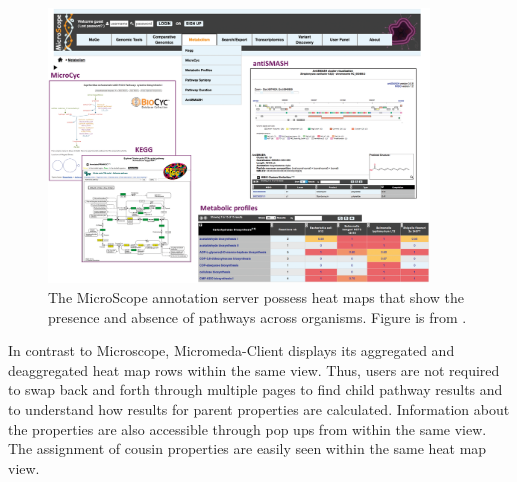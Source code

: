 \begin{figure}[!ht]
  \centering
	\includegraphics[width=0.9\textwidth]{media/microscope.png}
	 \caption{The MicroScope annotation server possess heat maps that show the presence and absence of pathways across organisms. Figure is from \cite{vallenet2016microscope}.}
	 \label{fig:microscope}
\end{figure}

In contrast to Microscope, Micromeda-Client displays its aggregated and deaggregated heat map rows within the same view. Thus, users are not required to swap back and forth through multiple pages to find child pathway results and to understand how results for parent properties are calculated. Information about the properties are also accessible through pop ups from within the same view. The assignment of cousin properties are easily seen within the same heat map view.

